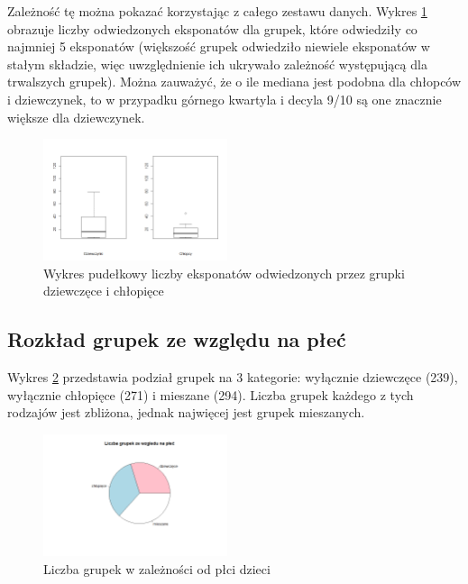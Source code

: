 \documentclass[conference]{IEEEtran}
\begin{document}
Zależność tę można pokazać korzystając z całego zestawu danych. Wykres \ref{grupki_d_c_liczba_eksponatow} obrazuje liczby odwiedzonych eksponatów dla grupek, które odwiedziły co najmniej 5 eksponatów (większość grupek odwiedziło niewiele eksponatów w stałym składzie, więc uwzględnienie ich ukrywało zależność występującą dla trwalszych grupek). Można zauważyć, że o ile mediana jest podobna dla chłopców i dziewczynek, to w przypadku górnego kwartyla i decyla 9/10 są one znacznie większe dla dziewczynek.

\begin{figure}[H]
\includegraphics[width=0.48\textwidth]{grupki_d_c_liczba_eksponatow.png}
\caption{Wykres pudełkowy liczby eksponatów odwiedzonych przez grupki dziewczęce i chłopięce}
\label{grupki_d_c_liczba_eksponatow}
\end{figure}


\subsection{Rozkład grupek ze względu na płeć}
Wykres \ref{grupki_plec} przedstawia podział grupek na 3 kategorie: wyłącznie dziewczęce (239), wyłącznie chłopięce (271) i mieszane (294). Liczba grupek każdego z tych rodzajów jest zbliżona, jednak najwięcej jest grupek mieszanych.

\begin{figure}[H]
\includegraphics[width=0.48\textwidth]{grupki_plec.png}
\caption{Liczba grupek w zależności od płci dzieci}


\label{grupki_plec}
\end{figure}
\end{document}

